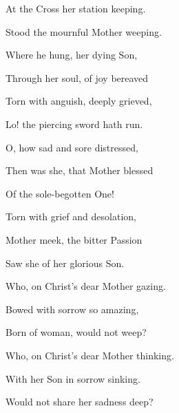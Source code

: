 \begin{multicols}{2}
\begin{hangparas}{1.25em}{1}
%
%

At the Cross her station keeping.

Stood the mournful Mother weeping.

Where he hung, her dying Son,%

\vspace{0.75\baselineskip}

Through her soul, of joy bereaved

Torn with anguish, deeply grieved,

Lo! the piercing sword hath run.%

\vspace{0.75\baselineskip}

O, how sad and sore distressed,

Then was she, that Mother blessed

Of the sole-begotten One!%

\vspace{0.75\baselineskip}

Torn with grief and desolation,

Mother meek, the bitter Passion

Saw she of her glorious Son.%

\vspace{0.75\baselineskip}

Who, on Christ's dear Mother gazing.

Bowed with sorrow so amazing,

Born of woman, would not weep?%

\vspace{0.75\baselineskip}

Who, on Christ's dear Mother thinking.

With her Son in sorrow sinking.

Would not share her sadness deep?%

\vspace{0.75\baselineskip}


\end{hangparas}
\end{multicols}
